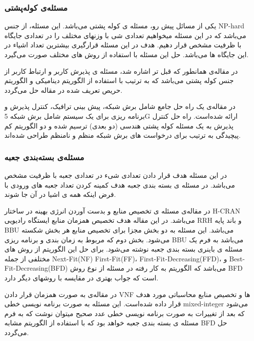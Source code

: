 \subsubsection{ مسئله‌ی کوله‌پشتی }
یکی از مسائل پیش رو، مسئله ی کوله پشتی 
می‌باشد.
این مسئله، از جنس NP-hard
می‌باشد که در این مسئله میخواهیم تعدادی شی با وزنهای مختلف را در تعدادی جایگاه با ظرفیت مشخص قرار دهیم.
هدف در این مسئله قرارگیری بیشترین تعداد اشیاء در این جایگاه ها می‌باشد.
حل این مسئله با استفاده از روش های مختلف صورت می‌گیرد.

در مقاله‌ی \cite{lee2018dynamic}
همانطور که قبل تر اشاره شد، مسئله ی پذیرش کاربر و ارتباط کاربر از جنس کوله پشتی
 می‌باشد که به ترتیب با استفاده از الگوریتم دینامیکی و الگوریتم حریص تعریف شده در مقاله
 حل می‌گردد.

در مقاله‌ی
\cite{sciancalepore2017mobile}
یک راه حل جامع شامل برش شبکه، پیش بینی ترافیک، کنترل پذیرش و برنامه ریزی برای یک سیستم شامل برش شبکه 5G ارائه شده‌است.
راه حل کنترل پذیرش به یک مسئله کوله پشتی هندسی (دو بعدی) ترسیم شده و دو الگوریتم کم پیچیدگی به ترتیب برای درخواست های برش شبکه منظم و نامنظم طراحی شده‌اند. 
\subsubsection{مسئله‌ی بسته‌بندی جعبه}
 در این مسئله هدف قرار دادن تعدادی شیء در تعدادی جعبه با ظرفیت مشخص می‌باشد.
در مسئله ی بسته بندی جعبه 
هدف کمینه کردن تعداد جعبه های ورودی با فرض اینکه همه ی اشیا در آن جا شوند.

در مقاله‌ی
\citep{wang2017joint}
مسئله ی تخصیص منابع و بدست آوردن انرژی بهینه در ساختار
H-CRAN
می‌باشد.
در این مقاله هدف تخصیص همزمان منابع ایستگاه رادیویی RRH و باند پایه BBU می‌باشد.
این مسئله به دو بخش مجزا برای تخصیص منابع هر بخش شکسته می‌شود.
بخش دوم که مربوط به زمان بندی و برنامه ریزی BBU می‌باشد به فرم یک مسئله ی باینری بسته بندی جعبه نوشته می‌شود.
برای حل این الگوریتم از روش های مختلفی از جمله
Next-Fit(NF)
First-Fit(FF)،
First-Fit-Decreasing(FFD)،
و
‌Best-Fit-Decreasing(BFD)
می‌باشد که الگوریتم به کار رفته در مسئله از نوع روش
BFD 
 است که جواب بهتری در مقایسه با روشهای دیگر دارد.  
 
در مقاله‌ی
\cite{de2020optimal}
به صورت همزمان قرار دادن VNF ها و تخصیص منابع محاسباتی مورد هدف قرار داده شده‌است.
این مسئله به صورت
برنامه نویسی خطی 
mixed-integer
می‌شود که بعد از تغییرات به صورت برنامه نویسی خطی عدد صحیح میتوان نوشت که به فرم مسئله ی بسته بندی جعبه خواهد بود که با استفاده از الگوریتم مشابه
BFD حل می‌گردد.
